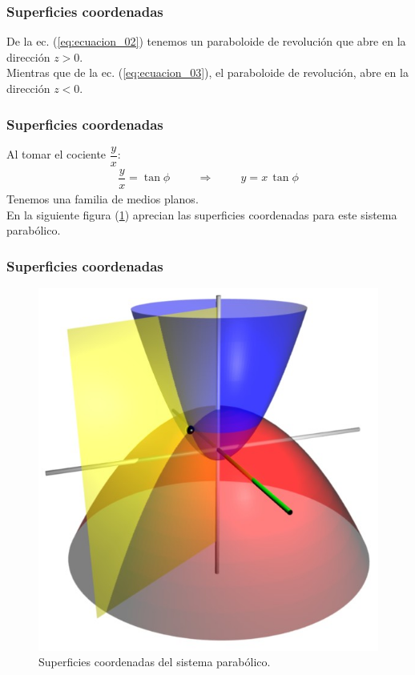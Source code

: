 \begin{frame}
\frametitle{Superficies coordenadas}
De la ec. (\ref{eq:ecuacion_02}) tenemos un paraboloide de revolución que abre en la dirección $z > 0$.
\\
\bigskip
Mientras que de la ec. (\ref{eq:ecuacion_03}), el paraboloide de revolución, abre en la dirección $z < 0$.
\end{frame}

\begin{frame}
\frametitle{Superficies coordenadas}
Al tomar el cociente $\dfrac{y}{x}$:
\begin{align*}
\dfrac{y}{x} = \tan \phi \hspace{1cm} \Longrightarrow \hspace{1cm} y = x \, \tan \phi
\end{align*}
Tenemos una familia de medios planos.
\\
\bigskip
En la siguiente figura (\ref{fig:figura_parabolica_3d}) aprecian las superficies coordenadas para este sistema parabólico.
\end{frame}
\begin{frame}
\frametitle{Superficies coordenadas}
\begin{figure}[H]
    \centering
    \includegraphics[scale=0.25]{Imagenes/Parabolic_coordinates_3D.png}
    \caption{Superficies coordenadas del sistema parabólico.}
    \label{fig:figura_parabolica_3d}
\end{figure}
\end{frame}
